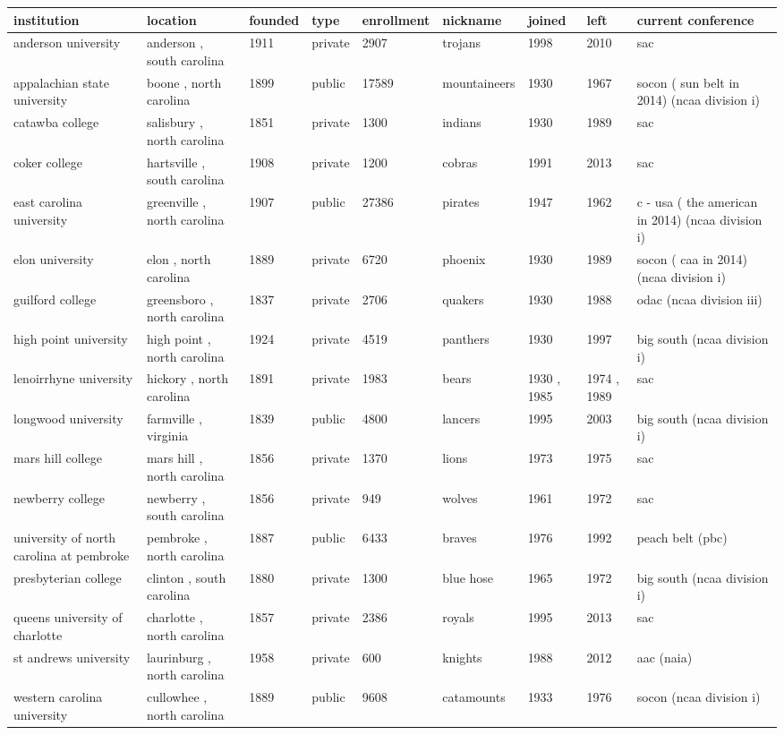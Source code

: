 \documentclass{article}
\begin{document}
\begin{tabular}{lllllllll}
\toprule
institution & location & founded & type & enrollment & nickname & joined & left & current conference \\
\midrule
anderson university & anderson , south carolina & 1911 & private & 2907 & trojans & 1998 & 2010 & sac \\
appalachian state university & boone , north carolina & 1899 & public & 17589 & mountaineers & 1930 & 1967 & socon ( sun belt in 2014) (ncaa division i) \\
catawba college & salisbury , north carolina & 1851 & private & 1300 & indians & 1930 & 1989 & sac \\
coker college & hartsville , south carolina & 1908 & private & 1200 & cobras & 1991 & 2013 & sac \\
east carolina university & greenville , north carolina & 1907 & public & 27386 & pirates & 1947 & 1962 & c - usa ( the american in 2014) (ncaa division i) \\
elon university & elon , north carolina & 1889 & private & 6720 & phoenix & 1930 & 1989 & socon ( caa in 2014) (ncaa division i) \\
guilford college & greensboro , north carolina & 1837 & private & 2706 & quakers & 1930 & 1988 & odac (ncaa division iii) \\
high point university & high point , north carolina & 1924 & private & 4519 & panthers & 1930 & 1997 & big south (ncaa division i) \\
lenoirrhyne university & hickory , north carolina & 1891 & private & 1983 & bears & 1930 , 1985 & 1974 , 1989 & sac \\
longwood university & farmville , virginia & 1839 & public & 4800 & lancers & 1995 & 2003 & big south (ncaa division i) \\
mars hill college & mars hill , north carolina & 1856 & private & 1370 & lions & 1973 & 1975 & sac \\
newberry college & newberry , south carolina & 1856 & private & 949 & wolves & 1961 & 1972 & sac \\
university of north carolina at pembroke & pembroke , north carolina & 1887 & public & 6433 & braves & 1976 & 1992 & peach belt (pbc) \\
presbyterian college & clinton , south carolina & 1880 & private & 1300 & blue hose & 1965 & 1972 & big south (ncaa division i) \\
queens university of charlotte & charlotte , north carolina & 1857 & private & 2386 & royals & 1995 & 2013 & sac \\
st andrews university & laurinburg , north carolina & 1958 & private & 600 & knights & 1988 & 2012 & aac (naia) \\
western carolina university & cullowhee , north carolina & 1889 & public & 9608 & catamounts & 1933 & 1976 & socon (ncaa division i) \\
\bottomrule
\end{tabular}
\end{document}
